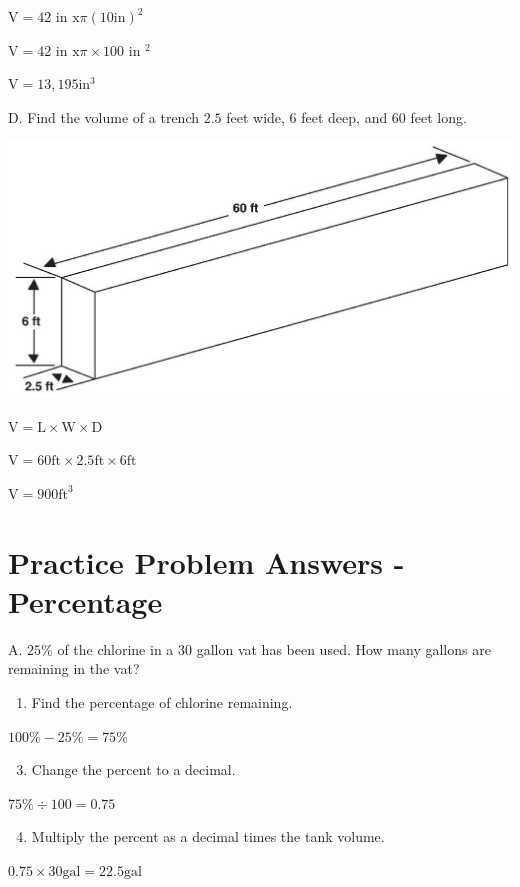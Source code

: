 \documentclass[10pt]{article}
\begin{document}
$\mathrm{V}=42$ in $\mathrm{x} \pi(10 \mathrm{in})^{2}$

$\mathrm{V}=42$ in $\mathrm{x} \pi \times 100$ in $^{2}$

$\mathrm{V}=13,195 \mathrm{in}^{3}$

D. Find the volume of a trench $2.5$ feet wide, 6 feet deep, and 60 feet long.

\includegraphics[max width=\textwidth]{2022_09_11_72dbedc910e6e984560cg-64(1)}

$\mathrm{V}=\mathrm{L} \times \mathrm{W} \times \mathrm{D}$

$\mathrm{V}=60 \mathrm{ft} \times 2.5 \mathrm{ft} \times 6 \mathrm{ft}$

$\mathrm{V}=900 \mathrm{ft}^{3}$

\section{Practice Problem Answers - Percentage}
A. $25 \%$ of the chlorine in a 30 gallon vat has been used. How many gallons are remaining in the vat?

\begin{enumerate}
  \item Find the percentage of chlorine remaining.
\end{enumerate}
$100 \%-25 \%=75 \%$

\begin{enumerate}
  \setcounter{enumi}{2}
  \item Change the percent to a decimal.
\end{enumerate}
$75 \% \div 100=0.75$

\begin{enumerate}
  \setcounter{enumi}{3}
  \item Multiply the percent as a decimal times the tank volume.
\end{enumerate}
$0.75 \times 30 \mathrm{gal}=22.5 \mathrm{gal}$
\end{document}
